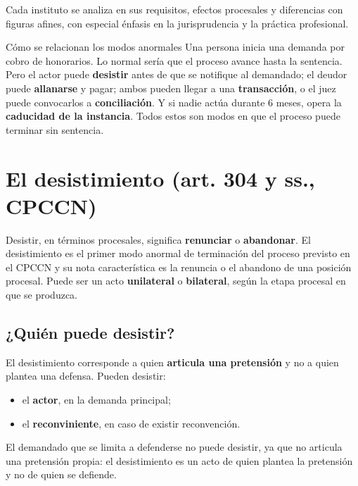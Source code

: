 \documentclass[12pt,oneside]{book}
\begin{document}
Cada instituto se analiza en sus requisitos, efectos procesales y diferencias con figuras afines, con especial énfasis en la jurisprudencia y la práctica profesional.

\begin{example}{Cómo se relacionan los modos anormales}
Una persona inicia una demanda por cobro de honorarios. Lo normal sería que el proceso avance hasta la sentencia. Pero el actor puede \textbf{desistir} antes de que se notifique al demandado; el deudor puede \textbf{allanarse} y pagar; ambos pueden llegar a una \textbf{transacción}, o el juez puede convocarlos a \textbf{conciliación}. Y si nadie actúa durante 6 meses, opera la \textbf{caducidad de la instancia}. Todos estos son modos en que el proceso puede terminar sin sentencia.
\end{example}

\section{El desistimiento (art. 304 y ss., CPCCN)}

Desistir, en términos procesales, significa \textbf{renunciar} o \textbf{abandonar}. %
El desistimiento es el primer modo anormal de terminación del proceso previsto en el CPCCN y su nota característica es la renuncia o el abandono de una posición procesal. Puede ser un acto \textbf{unilateral} o \textbf{bilateral}, según la etapa procesal en que se produzca.

\subsection{¿Quién puede desistir?}

El desistimiento corresponde a quien \textbf{articula una pretensión} y no a quien plantea una defensa. Pueden desistir:

\begin{itemize}
    \item el \textbf{actor}, en la demanda principal;
    \item el \textbf{reconviniente}, en caso de existir reconvención.
\end{itemize}

El demandado que se limita a defenderse no puede desistir, ya que no articula una pretensión propia: el desistimiento es un acto de quien plantea la pretensión y no de quien se defiende.
\end{document}
